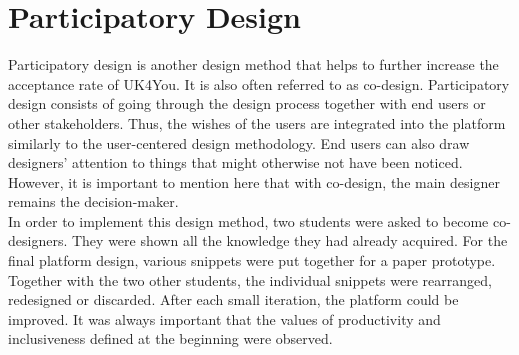 \section{Participatory Design}
Participatory design is another design method that helps to further increase the acceptance rate of UK4You\cite{participatory-design-spinuzzi}.
It is also often referred to as co-design. 
Participatory design consists of going through the design process together with end users or other stakeholders.
Thus, the wishes of the users are integrated into the platform similarly to the user-centered design methodology.
End users can also draw designers' attention to things that might otherwise not have been noticed.
However, it is important to mention here that with co-design, the main designer remains the decision-maker.\\

In order to implement this design method, two students were asked to become co-designers.
They were shown all the knowledge they had already acquired.
For the final platform design, various snippets were put together for a paper prototype.
Together with the two other students, the individual snippets were rearranged, redesigned or discarded.
After each small iteration, the platform could be improved.
It was always important that the values of productivity and inclusiveness defined at the beginning were observed.
